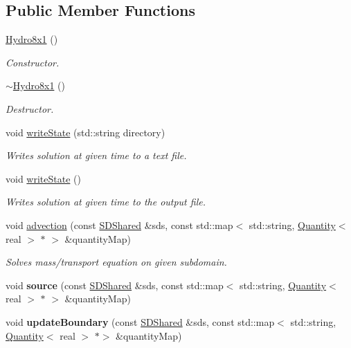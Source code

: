 \subsection*{Public Member Functions}
\begin{DoxyCompactItemize}
\item 
\mbox{\label{classHydro8x1_a0015eee19579336ad49f9bbfb8e037f9}} 
\mbox{\hyperlink{classHydro8x1_a0015eee19579336ad49f9bbfb8e037f9}{Hydro8x1}} ()
\begin{DoxyCompactList}\small\item\em Constructor. \end{DoxyCompactList}\item 
\mbox{\label{classHydro8x1_a922b8f2d3f55a670339582570a8e0528}} 
\mbox{\hyperlink{classHydro8x1_a922b8f2d3f55a670339582570a8e0528}{$\sim$\+Hydro8x1}} ()
\begin{DoxyCompactList}\small\item\em Destructor. \end{DoxyCompactList}\item 
void \mbox{\hyperlink{classHydro8x1_a475ddb381ec164a5adf8f2acc0b2802e}{write\+State}} (std\+::string directory)
\begin{DoxyCompactList}\small\item\em Writes solution at given time to a text file. \end{DoxyCompactList}\item 
void \mbox{\hyperlink{classHydro8x1_a37b7863b77dd7569e20c1c24aad3a36d}{write\+State}} ()
\begin{DoxyCompactList}\small\item\em Writes solution at given time to the output file. \end{DoxyCompactList}\item 
void \mbox{\hyperlink{classHydro8x1_a762bfa07dad77841758e72e959cb6d22}{advection}} (const \mbox{\hyperlink{classSDShared}{S\+D\+Shared}} \&sds, const std\+::map$<$ std\+::string, \mbox{\hyperlink{classQuantity}{Quantity}}$<$ real $>$ $\ast$ $>$ \&quantity\+Map)
\begin{DoxyCompactList}\small\item\em Solves mass/transport equation on given subdomain. \end{DoxyCompactList}\item 
\mbox{\label{classHydro8x1_a4d982b3f14c71c0b34b918bfb98125a2}} 
void {\bfseries source} (const \mbox{\hyperlink{classSDShared}{S\+D\+Shared}} \&sds, const std\+::map$<$ std\+::string, \mbox{\hyperlink{classQuantity}{Quantity}}$<$ real $>$ $\ast$ $>$ \&quantity\+Map)
\item 
\mbox{\label{classHydro8x1_a9e97fad1f28de585c93ae6d15d6a243c}} 
void {\bfseries update\+Boundary} (const \mbox{\hyperlink{classSDShared}{S\+D\+Shared}} \&sds, const std\+::map$<$ std\+::string, \mbox{\hyperlink{classQuantity}{Quantity}}$<$ real $>$ $\ast$$>$ \&quantity\+Map)
\end{DoxyCompactItemize}
